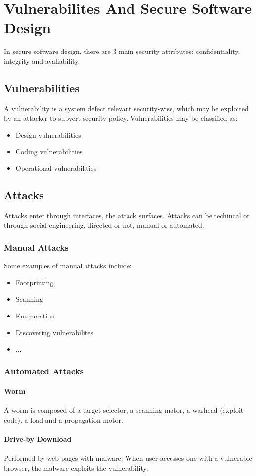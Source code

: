 \documentclass[10pt,a4paper]{report}
\begin{document}
\chapter{Vulnerabilites And Secure Software Design}
In secure software design, there are 3 main security attributes: confidentiality, integrity and avaliability.
\section{Vulnerabilities}
A vulnerability is a system defect relevant security-wise, which may be exploited by an attacker to subvert security policy. Vulnerabilities may be classified as:
\begin{itemize}
\item Design vulnerabilities
\item Coding vulnerabilities
\item Operational vulnerabilities
\end{itemize}
\section{Attacks}
Attacks enter through interfaces, the attack surfaces. Attacks can be techincal or through social engineering, directed or not, manual or automated.
\subsection{Manual Attacks}
Some examples of manual attacks include:
\begin{itemize}
\item Footprinting
\item Scanning
\item Enumeration
\item Discovering vulnerabilites
\item ...
\end{itemize}
\subsection{Automated Attacks}
\subsubsection{Worm}
A worm is composed of a target selector, a scanning motor, a warhead (exploit code), a load and a propagation motor.
\subsubsection{Drive-by Download}
Performed by web pages with malware. When user accesses one with a vulnerable browser, the malware exploits the vulnerability.
\end{document}
